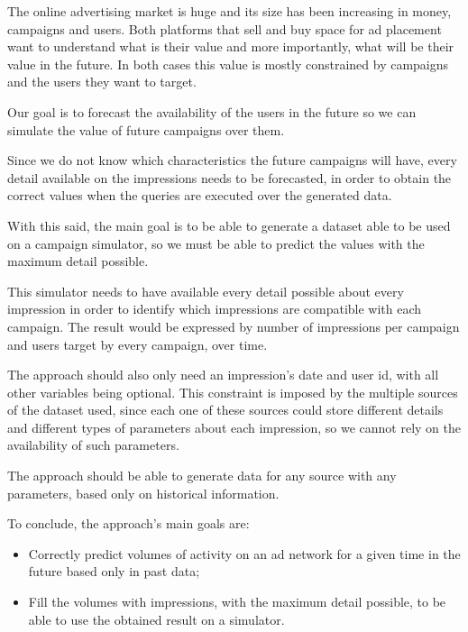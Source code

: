 The online advertising market is huge and its size has been increasing in money,
campaigns and users. Both platforms that sell and buy space for ad placement
want to understand what is their value and more importantly, what will be their
value in the future. In both cases this value is mostly constrained by campaigns
and the users they want to target.

Our goal is to forecast the availability of the users in the future so we can
simulate the value of future campaigns over them.

Since we do not know which characteristics the future campaigns will have, every
detail available on the impressions needs to be forecasted, in order to
obtain the correct values when the queries are executed over the generated data.

With this said, the main goal is to be able to generate a dataset able to be used on a campaign
simulator, so we must be able to predict the values with the maximum detail
possible.

This simulator needs to have available every detail possible about every
impression in order to identify which impressions are compatible with each
campaign. The result would be expressed by number of impressions per campaign and
users target by every campaign, over time.

The approach should also only need an impression's date and user id, with all
other variables being optional.
This constraint is imposed by the multiple sources of the dataset used, since
each one of these sources could store different details and different types of
parameters about each impression, so we cannot rely on the availability of
such parameters.

The approach should be able to generate data for any source
with any parameters, based only on historical information.

To conclude, the approach's main goals are:
\begin{itemize}
\item Correctly predict volumes of activity on an ad network for a given time in
  the future based only in past data;
\item Fill the volumes with impressions, with the maximum detail possible, to be
  able to use the obtained result on a simulator.
\end{itemize}


